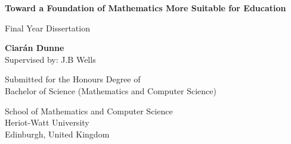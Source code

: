 \documentclass[11pt]{report}
\author{Ciarán Dunne}
\theoremstyle{definition}
\theoremstyle{theorem}
\theoremstyle{lemma}
\begin{document}
\begin{titlepage}
   \begin{center}
       \vspace*{1cm}

       \Large
       \textbf{Toward a Foundation of Mathematics More Suitable for Education}

       \vspace{0.5cm}
       \large
        Final Year Dissertation

       \vspace{1.5cm}

       \textbf{Ciarán Dunne}\\
       Supervised by: J.B Wells
       \vfill

       Submitted for the Honours Degree of \\
       Bachelor of Science (Mathematics and Computer Science)

       \vspace{0.8cm}

       School of Mathematics and Computer Science\\
       Heriot-Watt University\\
       Edinburgh, United Kingdom\\
   \end{center}
\end{titlepage}
\end{document}
